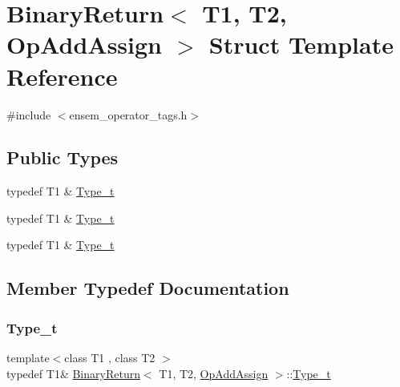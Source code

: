 \hypertarget{structBinaryReturn_3_01T1_00_01T2_00_01OpAddAssign_01_4}{}\section{Binary\+Return$<$ T1, T2, Op\+Add\+Assign $>$ Struct Template Reference}
\label{structBinaryReturn_3_01T1_00_01T2_00_01OpAddAssign_01_4}


{\ttfamily \#include $<$ensem\+\_\+operator\+\_\+tags.\+h$>$}

\subsection*{Public Types}
\begin{DoxyCompactItemize}
\item 
typedef T1 \& \mbox{\hyperlink{structBinaryReturn_3_01T1_00_01T2_00_01OpAddAssign_01_4_ac69ceb90c901b063de9f436ab55169f5}{Type\+\_\+t}}
\item 
typedef T1 \& \mbox{\hyperlink{structBinaryReturn_3_01T1_00_01T2_00_01OpAddAssign_01_4_ac69ceb90c901b063de9f436ab55169f5}{Type\+\_\+t}}
\item 
typedef T1 \& \mbox{\hyperlink{structBinaryReturn_3_01T1_00_01T2_00_01OpAddAssign_01_4_ac69ceb90c901b063de9f436ab55169f5}{Type\+\_\+t}}
\end{DoxyCompactItemize}


\subsection{Member Typedef Documentation}
\mbox{\label{structBinaryReturn_3_01T1_00_01T2_00_01OpAddAssign_01_4_ac69ceb90c901b063de9f436ab55169f5}} 
\subsubsection{\texorpdfstring{Type\_t}{Type\_t}\hspace{0.1cm}{\footnotesize\ttfamily [1/3]}}
{\footnotesize\ttfamily template$<$class T1 , class T2 $>$ \\
typedef T1\& \mbox{\hyperlink{structBinaryReturn}{Binary\+Return}}$<$ T1, T2, \mbox{\hyperlink{structOpAddAssign}{Op\+Add\+Assign}} $>$\+::\mbox{\hyperlink{structBinaryReturn_3_01T1_00_01T2_00_01OpAddAssign_01_4_ac69ceb90c901b063de9f436ab55169f5}{Type\+\_\+t}}}

